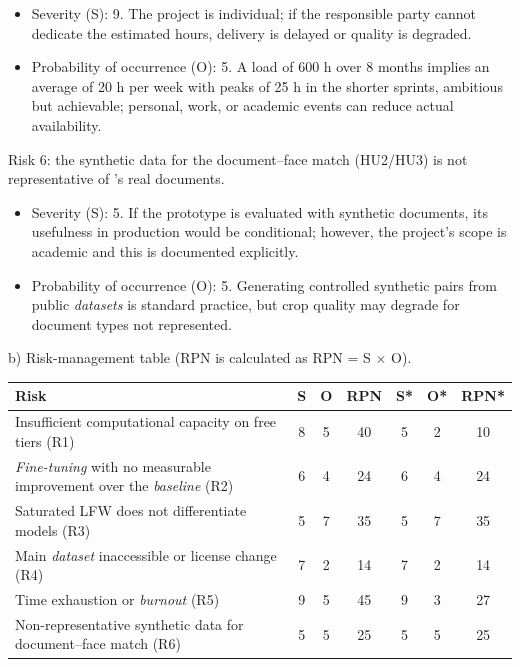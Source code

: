 \documentclass[
  11pt, %
]{charter}
\begin{document}
\begin{itemize}
\item Severity (S): 9. The project is individual; if the responsible party cannot dedicate the estimated hours, delivery is delayed or quality is degraded.
\item Probability of occurrence (O): 5. A load of 600 h over 8 months implies an average of 20 h per week with peaks of 25 h in the shorter sprints, ambitious but achievable; personal, work, or academic events can reduce actual availability.
\end{itemize}

Risk 6: the synthetic data for the document--face match (HU2/HU3) is not representative of \empclientename's\hspace{1px} real documents.

\begin{itemize}
\item Severity (S): 5. If the prototype is evaluated with synthetic documents, its usefulness in production would be conditional; however, the project's scope is academic and this is documented explicitly.
\item Probability of occurrence (O): 5. Generating controlled synthetic pairs from public \textit{datasets} is standard practice, but crop quality may degrade for document types not represented.
\end{itemize}

b) Risk-management table (RPN is calculated as RPN = S $\times$ O).

\begin{table}[htpb]
\centering
\begin{tabularx}{\linewidth}{@{}|X|c|c|c|c|c|c|@{}}
\hline
\rowcolor[HTML]{C0C0C0}
Risk & S & O & RPN & S* & O* & RPN* \\ \hline
Insufficient computational capacity on free tiers (R1) & 8 & 5 & 40 & 5 & 2 & 10 \\ \hline
\textit{Fine-tuning} with no measurable improvement over the \textit{baseline} (R2) & 6 & 4 & 24 & 6 & 4 & 24 \\ \hline
Saturated LFW does not differentiate models (R3) & 5 & 7 & 35 & 5 & 7 & 35 \\ \hline
Main \textit{dataset} inaccessible or license change (R4) & 7 & 2 & 14 & 7 & 2 & 14 \\ \hline
Time exhaustion or \textit{burnout} (R5) & 9 & 5 & 45 & 9 & 3 & 27 \\ \hline
Non-representative synthetic data for document--face match (R6) & 5 & 5 & 25 & 5 & 5 & 25 \\ \hline
\end{tabularx}%
\end{table}
\end{document}
